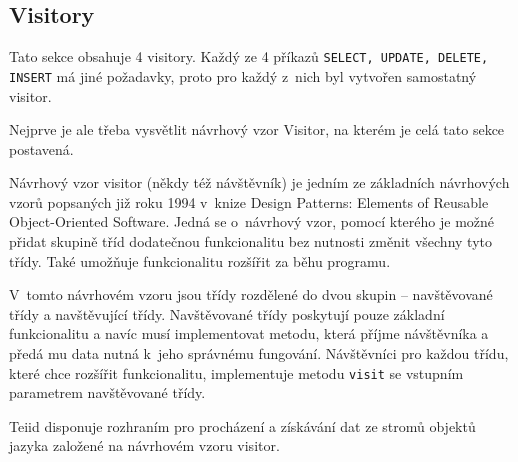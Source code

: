 \documentclass[oneside,12pt]{fithesis2}
\begin{document}
\subsection{Visitory}
\label{visitory}
Tato sekce obsahuje 4 visitory. Každý ze 4 příkazů \texttt{SELECT, UPDATE, DELETE, INSERT} má jiné požadavky, proto pro každý z~nich byl vytvořen samostatný visitor.

Nejprve je ale třeba vysvětlit návrhový vzor Visitor, na kterém je celá tato sekce postavená.

Návrhový vzor visitor (někdy též návštěvník) je jedním ze základních návrhových vzorů popsaných již roku 1994 v~knize Design Patterns: Elements of Reusable Object-Oriented Software\cite{designPatterns}. Jedná se o~návrhový vzor, pomocí kterého je možné přidat skupině tříd dodatečnou funkcionalitu bez nutnosti změnit všechny tyto třídy. Také umožňuje funkcionalitu rozšířit za běhu programu.

V~tomto návrhovém vzoru jsou třídy rozdělené do dvou skupin -- navštěvované třídy a navštěvující třídy. Navštěvované třídy poskytují pouze základní funkcionalitu a navíc musí implementovat metodu, která příjme návštěvníka a předá mu data nutná k~jeho správnému fungování. Návštěvníci pro každou třídu, které chce rozšířit funkcionalitu, implementuje metodu \texttt{visit} se vstupním parametrem navštěvované třídy.

Teiid disponuje rozhraním pro procházení a získávání dat ze stromů objektů jazyka založené na návrhovém vzoru visitor.
\end{document}
